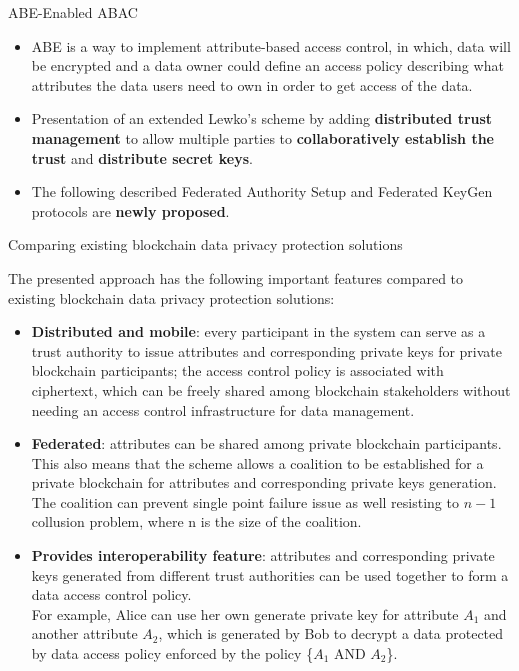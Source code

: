 \documentclass[11pt]{beamer}
\begin{document}
\begin{frame}{ABE-Enabled ABAC}
\begin{itemize}
\item ABE is a way to implement attribute-based access control, in which,
data will be encrypted and a data owner could define an access policy describing what attributes the data users need to own in order to get access of the data.
\item Presentation of an extended Lewko's scheme \cite{lewkowaters} by adding \textbf{distributed trust management} to allow multiple parties to \textbf{collaboratively establish the trust} and \textbf{distribute secret keys}.
\item The following described Federated Authority Setup and Federated KeyGen protocols are \textbf{newly proposed}.
\end{itemize}

\end{frame}

\begin{frame}[allowframebreaks]{Comparing existing blockchain data privacy protection solutions}

The presented approach has the following important features compared to existing blockchain data privacy protection solutions:

\begin{itemize}

\item \textbf{Distributed and mobile}: every participant in the system can serve as a trust authority to issue attributes and corresponding private keys for private blockchain participants; the access control policy is associated with ciphertext, which can be freely shared among blockchain stakeholders without needing an access control infrastructure for data management.
\item \textbf{Federated}: attributes can be shared among private blockchain participants. This also means that the scheme allows a coalition to be established for a private blockchain for attributes and corresponding private keys generation. The coalition can prevent single point failure issue as well resisting to $n - 1$ collusion problem, where n is the size of the coalition.
\item \textbf{Provides interoperability feature}: attributes and corresponding private keys generated from different trust authorities can be used together to form a data access control policy.\\For example, Alice can use her own generate private key for attribute $A_1$ and another attribute $A_2$, which is generated by Bob to decrypt a data protected by data access policy enforced by the policy \{$A_1$ AND $A_2$\}.
\end{itemize}

\end{frame}
\end{document}
